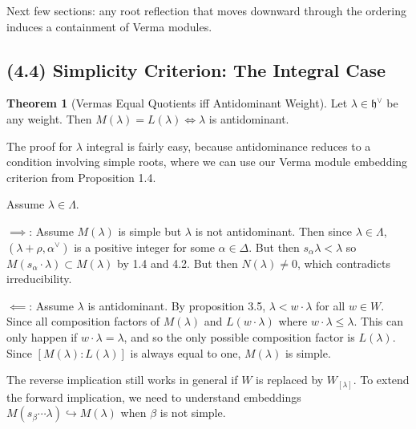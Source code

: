 \documentclass[11pt]{scrartcl}
\theoremstyle{definition}
\theoremstyle{theorem}
\newtheorem{theorem}{Theorem}[section]
\theoremstyle{proof}
\newenvironment{proof}
{\pushQED{$\qed$}\pf}
{\par\popQED\endpf}
\theoremstyle{definition}
\theoremstyle{break}
\theoremstyle{problem}
\providecommand{\tightlist}{%
  \setlength{\itemsep}{0pt}\setlength{\parskip}{0pt}}
\newcommand{\dual}[0]{^\vee}
\newcommand{\injects}[0]{\hookrightarrow}
\newcommand{\lieh}[0]{{\mathfrak{h}}}
\renewcommand{\qed}[0]{\hfill\blacksquare}
\begin{document}
Next few sections: any root reflection that moves downward through the
ordering induces a containment of Verma modules.

\hypertarget{simplicity-criterion-the-integral-case}{%
\subsection{(4.4) Simplicity Criterion: The Integral
Case}\label{simplicity-criterion-the-integral-case}}

\begin{theorem}[Vermas Equal Quotients iff Antidominant Weight]

Let \(\lambda \in \lieh\dual\) be any weight. Then
\(M(\lambda) = L(\lambda) \iff \lambda\) is antidominant.\end{theorem}

The proof for \(\lambda\) integral is fairly easy, because antidominance
reduces to a condition involving simple roots, where we can use our
Verma module embedding criterion from Proposition 1.4.

\begin{proof}[Integral Case]

Assume \(\lambda \in \Lambda\).

\(\implies\): Assume \(M(\lambda)\) is simple but \(\lambda\) is not
antidominant. Then since \(\lambda \in \Lambda\),
\((\lambda + \rho, \alpha\dual)\) is a positive integer for some
\(\alpha \in \Delta\). But then \(s_\alpha \lambda < \lambda\) so
\(M(s_\alpha \cdot \lambda) \subset M(\lambda)\) by 1.4 and 4.2. But
then \(N(\lambda) \neq 0\), which contradicts irreducibility.

\(\impliedby\): Assume \(\lambda\) is antidominant. By proposition 3.5,
\(\lambda < w\cdot \lambda\) for all \(w\in W\). Since all composition
factors of \(M(\lambda)\) and \(L(w\cdot \lambda)\) where
\(w\cdot \lambda \leq \lambda\). This can only happen if
\(w\cdot \lambda = \lambda\), and so the only possible composition
factor is \(L(\lambda)\). Since \([M(\lambda) : L(\lambda)]\) is always
equal to one, \(M(\lambda)\) is simple.\end{proof}

\begin{description}
\tightlist
\item[Remark]
The reverse implication still works in general if \(W\) is replaced by
\(W_{[\lambda]}\). To extend the forward implication, we need to
understand embeddings \(M(s_\beta \cdots \lambda) \injects M(\lambda)\)
when \(\beta\) is not simple.
\end{description}
\end{document}
